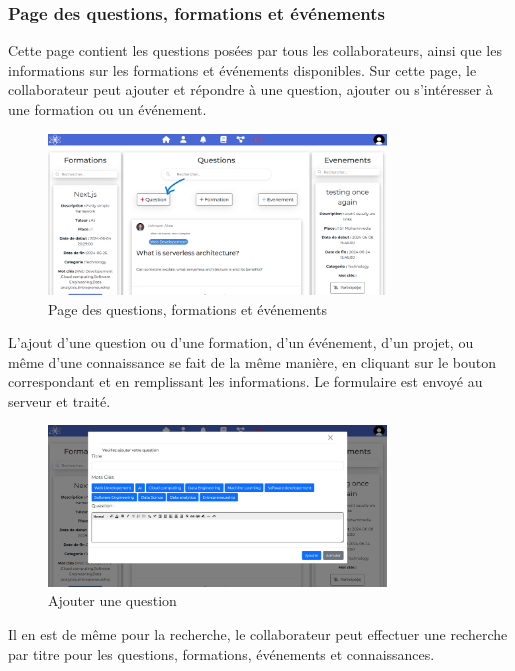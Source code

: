 \documentclass{article}
\begin{document}
                \subsubsection{Page des questions, formations et événements}
                    Cette page contient les questions posées par tous les collaborateurs, ainsi que les informations sur les formations et événements disponibles. Sur cette page, le collaborateur peut ajouter et répondre à une question, ajouter ou s'intéresser à une formation ou un événement.
                    \begin{figure}[h!]
                        \centering
                        \includegraphics[width=0.8\textwidth]{assets/webSite/Acceuil.png}
                        \caption{Page des questions, formations et événements}
                    \end{figure}
                    \FloatBarrier
                    L'ajout d'une question ou d'une formation, d'un événement, d'un projet, ou même d'une connaissance se fait de la même manière, en cliquant sur le bouton correspondant et en remplissant les informations. Le formulaire est envoyé au serveur et traité.
                    \begin{figure}[h!]
                        \centering
                        \includegraphics[width=0.8\textwidth]{assets/webSite/addQuestion.png}
                        \caption{Ajouter une question}
                    \end{figure}
                    \FloatBarrier
                    Il en est de même pour la recherche, le collaborateur peut effectuer une recherche par titre pour les questions, formations, événements et connaissances.
\end{document}
